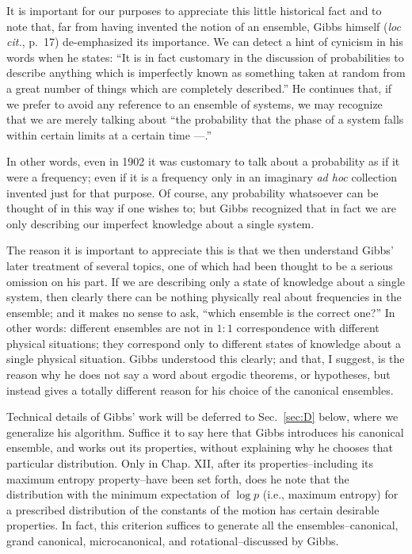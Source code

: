 It is important for our purposes to appreciate this little historical fact and to note that, far from having invented the notion of an ensemble, Gibbs himself (\emph{loc cit.}, p.~17) de-emphasized its importance.
We can detect a hint of cynicism in his words when he states: ``It is in fact customary in the discussion of probabilities to describe anything which is imperfectly known as something taken at random from a great number of things which are completely described.''
He continues that, if we prefer to avoid any reference to an ensemble of systems, we may recognize that we are merely talking about ``the probability that the phase of a system falls within certain limits at a certain time ---.''

In other words, even in 1902 it was customary to talk about a probability as if it were a frequency; even if it is a frequency only in an imaginary \emph{ad hoc} collection invented just for that purpose.
Of course, any probability whatsoever can be thought of in this way if one wishes to; but Gibbs recognized that in fact we are only describing our imperfect knowledge about a single system.

The reason it is important to appreciate this is that we then understand Gibbs’ later treatment of several topics, one of which had been thought to be a serious omission on his part.
If we are describing only a state of knowledge about a single system, then clearly there can be nothing physically real about frequencies in the ensemble; and it makes no sense to ask, ``which ensemble is the correct one?''
In other words: different ensembles are not in $1:1$ correspondence with different physical situations; they correspond only to different states of knowledge about a single physical situation.
Gibbs understood this clearly; and that, I suggest, is the reason why he does not say a word about ergodic theorems, or hypotheses, but instead gives a totally different reason for his choice of the canonical ensembles.

Technical details of Gibbs' work will be deferred to Sec.~\ref{sec:D} below, where we generalize his algorithm.
Suffice it to say here that Gibbs introduces his canonical ensemble, and works out its properties, without explaining why he chooses that particular distribution.
Only in Chap. XII, after its properties--including its maximum entropy property--have been set forth, does he note that the distribution with the minimum expectation of $\log p$ (i.e., maximum entropy) for a prescribed distribution of the constants of the motion has certain desirable properties.
In fact, this criterion suffices to generate all the ensembles--canonical, grand canonical, microcanonical, and rotational--discussed by Gibbs.

